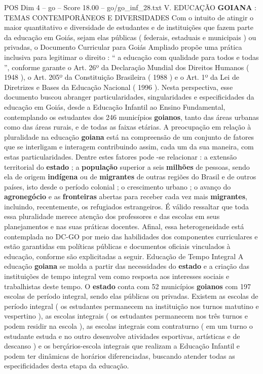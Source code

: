 \begin{textsample}{POS Dim 4 – go – Score 18.00 – go/go\_inf\_28.txt}  \label{ex:f4_pos_061}
V.
EDUCAÇÃO \textbf{GOIANA} : TEMAS CONTEMPORÂNEOS E DIVERSIDADES Com o intuito de atingir o maior quantitativo e diversidade de estudantes e de instituições que fazem parte da educação em Goiás, sejam elas públicas ( federais, estaduais e municipais ) ou privadas, o Documento Curricular para Goiás Ampliado propõe uma prática inclusiva para legitimar o direito : “ a educação com qualidade para todos e todas ”, conforme garante o Art. 26º da Declaração Mundial dos Direitos Humanos ( 1948 ), o Art. 205º da Constituição Brasileira ( 1988 ) e o Art. 1º da Lei de Diretrizes e Bases da Educação Nacional ( 1996 ).
Nesta perspectiva, esse documento buscou abranger particularidades, singularidades e especificidades da educação em Goiás, desde a Educação Infantil ao Ensino Fundamental, contemplando os estudantes dos 246 municípios \textbf{goianos}, tanto das áreas urbanas como das áreas rurais, e de todas as faixas etárias.
A preocupação em relação à pluralidade na educação \textbf{goiana} está na compreensão de um conjunto de fatores que se interligam e interagem contribuindo assim, cada um da sua maneira, com estas particularidades.
Dentre estes fatores pode -se relacionar : a extensão territorial do \textbf{estado} ; a \textbf{população} superior a seis \textbf{milhões} de pessoas, sendo ela de origem \textbf{indígena} ou de \textbf{migrantes} de outras regiões do Brasil e de outros países, isto desde o período colonial ; o crescimento urbano ; o avanço do \textbf{agronegócio} e as \textbf{fronteiras} abertas para receber cada vez mais \textbf{migrantes}, incluindo, recentemente, os refugiados estrangeiros.
É válido ressaltar que toda essa pluralidade merece atenção dos professores e das escolas em seus planejamentos e nas suas práticas docentes.
Afinal, essa heterogeneidade está contemplada no DC-GO por meio das habilidades dos componentes curriculares e estão garantidas em políticas públicas e documentos oficiais vinculados à educação, conforme são explicitadas a seguir.
Educação de Tempo Integral A educação \textbf{goiana} se molda a partir das necessidades do \textbf{estado} e a criação das instituições de tempo integral vem como resposta aos interesses sociais e trabalhistas deste tempo.
O \textbf{estado} conta com 52 municípios \textbf{goianos} com 197 escolas de período integral, sendo elas públicas ou privadas.
Existem as escolas de período integral ( os estudantes permanecem na instituição nos turnos matutino e vespertino ), as escolas integrais ( os estudantes permanecem nos três turnos e podem residir na escola ), as escolas integrais com contraturno ( em um turno o estudante estuda e no outro desenvolve atividades esportivas, artísticas e de descanso ) e os berçários-escola integrais que realizam a Educação Infantil e podem ter dinâmicas de horários diferenciadas, buscando atender todas as especificidades desta etapa da educação.

\end{textsample}
